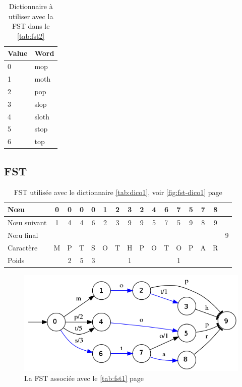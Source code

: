 \begin{table}[h]
    \centering
    \begin{tabular}{|l|l|}
        \hline
        Value & Word \\
        \hline
        0 & mop \\
        1 & moth \\
        2 & pop \\
        3 & slop \\
        4 & sloth \\
        5 & stop \\
        6 & top \\
        \hline
    \end{tabular}
    \caption{Dictionnaire à utiliser avec la FST dans le \autoref{tab:fst2}}
    \label{tab:dico2}
\end{table}

\clearpage
\subsection{FST}

\begin{table}[ht]
    \centering
    \begin{tabular}{|l||c|c|c|c|c|c|c|c|c|c|c|c|c|c|c|}
        \hline
        N\oe u & 0 & 0 & 0 & 0 & 1 & 2 & 3 & 2 & 4 & 6 & 7 & 5 & 7 & 8 & \\ \hline
        N\oe u suivant & 1 & 4 & 4 & 6 & 2 & 3 & 9 & 9 & 5 & 7 & 5 & 9 & 8 & 9 & \\ \hline
        N\oe u final &&&&&&&&&&&&&&& 9 \\ \hline
        Caractère & M & P & T & S& O & T & H & P & O & T & O & P & A & R & \\ \hline
        Poids & & 2 & 5 & 3 &&& 1 &&&&1&&&& \\ \hline
    \end{tabular}
    \caption{FST utilisée avec le dictionnaire \autoref{tab:dico1}, voir \autoref{fig:fst-dico1} page \pageref{fig:fst-dico1}}
    \label{tab:fst1}
\end{table}

\begin{figure}[ht]
    \centering
    \includegraphics[scale=0.5]{../c_asm/1.png}
    \caption{La FST associée avec le \autoref{tab:fst1} page \pageref{tab:fst1}}
    \label{fig:fst-dico1}
\end{figure}

